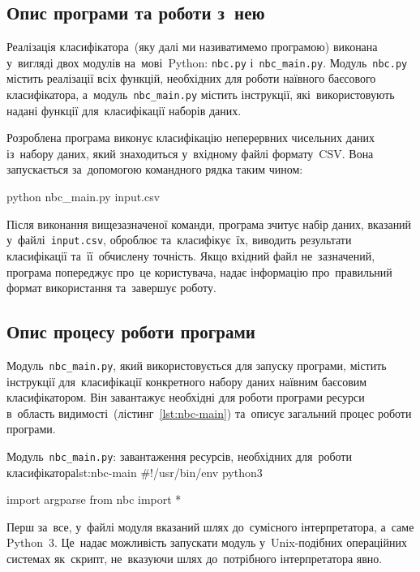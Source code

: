 \documentclass[
	a4paper,
	oneside,
	DIV = 12,
	fontsize = 13pt,
	headings = normal,
	numbers = endperiod,
]{scrartcl}
\theoremstyle{mythm}
\newcommand{\allcaps}[1]{{\addfontfeatures{LetterSpace = 8, Kerning = Off}#1}}
\newcommand{\filename}[1]{\texttt{#1}}
\begin{document}
		\subsection{Опис програми та роботи з~нею}
			Реалізація класифікатора~(яку далі ми називатимемо програмою) виконана у~вигляді двох модулів на~мові~\textenglish{Python}: \filename{nbc.py} і~\filename{nbc\_main.py}. Модуль~\filename{nbc.py} містить реалізації всіх функцій, необхідних для роботи наївного баєсового класифікатора, а~модуль~\filename{nbc\_main.py} містить інструкції, які~використовують надані функції для~класифікації наборів даних. 
			
			Розроблена програма виконує класифікацію неперервних чисельних даних із~набору даних, який знаходиться у~вхідному файлі формату~\textenglish{\allcaps{CSV}}. Вона запускається за~допомогою командного рядка таким чином:
			\begin{bashcode}
				python nbc_main.py input.csv
			\end{bashcode}
			Після виконання вищезазначеної команди, програма зчитує набір даних, вказаний у~файлі~\filename{input.csv}, оброблює та~класифікує~їх, виводить результати класифікації та~її~обчислену точність. Якщо вхідний файл не~зазначений, програма попереджує про~це користувача, надає інформацію про~правильний формат використання та~завершує роботу.

		\subsection{Опис процесу роботи програми}

			Модуль~\filename{nbc\_main.py}, який використовується для запуску програми, містить інструкції для~класифікації конкретного набору даних наївним баєсовим класифікатором. Він завантажує необхідні для роботи програми ресурси в~область видимості~(лістинг~\ref{lst:nbc-main}) та~описує загальний процес роботи програми.

			\begin{listingpython}{Модуль~\filename{nbc\_main.py}: завантаження ресурсів, необхідних для~роботи класифікатора}{lst:nbc-main}
				#!/usr/bin/env python3

				import argparse
				from nbc import *
			\end{listingpython}

			Перш за~все, у~файлі модуля вказаний шлях до~сумісного інтерпретатора, а~саме \textenglish{Python~3}. Це~надає можливість запускати модуль у~\textenglish{Unix}-подібних операційних системах як~скрипт, не~вказуючи шлях до~потрібного інтерпретатора явно.
			
\end{document}
